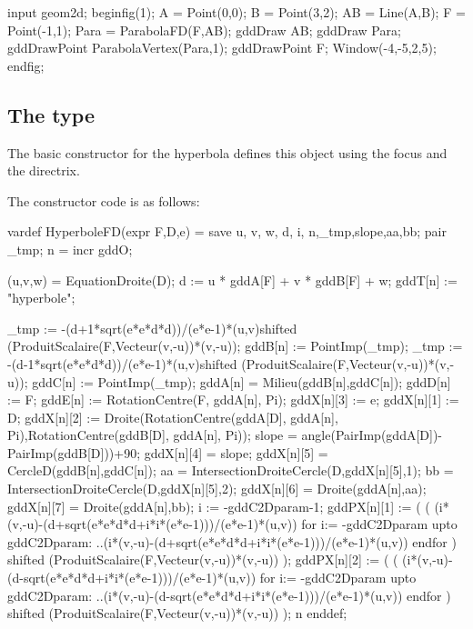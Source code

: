 \documentclass[a4paper,english]{article}
\begin{document}
\begin{ExempleMP}
input geom2d;
beginfig(1);
A = Point(0,0);
B = Point(3,2);
AB = Line(A,B);
F = Point(-1,1);
Para = ParabolaFD(F,AB);
gddDraw AB;
gddDraw Para;
gddDrawPoint ParabolaVertex(Para,1);
gddDrawPoint F;
Window(-4,-5,2,5);
endfig;
\end{ExempleMP}


\subsection{The  type}

The basic constructor for the hyperbola defines this object using the focus and
the directrix. 

The constructor code is as follows:
\begin{mpcode}
vardef HyperboleFD(expr F,D,e) =
  save u, v, w, d, i, n,_tmp,slope,aa,bb; 
  pair _tmp;
  n = incr gddO;

  (u,v,w) = EquationDroite(D);
  d := u * gddA[F] + v * gddB[F] + w;
  gddT[n] := "hyperbole"; 
  
  _tmp := -(d+1*sqrt(e*e*d*d))/(e*e-1)*(u,v)shifted (ProduitScalaire(F,Vecteur(v,-u))*(v,-u));
  gddB[n] := PointImp(_tmp);
  _tmp := -(d-1*sqrt(e*e*d*d))/(e*e-1)*(u,v)shifted
  (ProduitScalaire(F,Vecteur(v,-u))*(v,-u));
  gddC[n] := PointImp(_tmp);
  gddA[n] = Milieu(gddB[n],gddC[n]);
  gddD[n] := F;
  gddE[n] := RotationCentre(F, gddA[n], Pi);
  gddX[n][3] := e; %
  gddX[n][1] := D; %
  gddX[n][2] := Droite(RotationCentre(gddA[D], gddA[n], Pi),RotationCentre(gddB[D], gddA[n], Pi));
  slope = angle(PairImp(gddA[D])-PairImp(gddB[D]))+90;
  gddX[n][4] = slope;
  gddX[n][5] = CercleD(gddB[n],gddC[n]);
  aa = IntersectionDroiteCercle(D,gddX[n][5],1);
  bb = IntersectionDroiteCercle(D,gddX[n][5],2);
  gddX[n][6] = Droite(gddA[n],aa);
  gddX[n][7] = Droite(gddA[n],bb);
  i := -gddC2Dparam-1;
  gddPX[n][1] := (
    (
    (i*(v,-u)-(d+sqrt(e*e*d*d+i*i*(e*e-1)))/(e*e-1)*(u,v))
    for i:= -gddC2Dparam upto gddC2Dparam:
      ..(i*(v,-u)-(d+sqrt(e*e*d*d+i*i*(e*e-1)))/(e*e-1)*(u,v))
    endfor
  ) shifted (ProduitScalaire(F,Vecteur(v,-u))*(v,-u))
  );
  gddPX[n][2] := (
    (
    (i*(v,-u)-(d-sqrt(e*e*d*d+i*i*(e*e-1)))/(e*e-1)*(u,v))
    for i:= -gddC2Dparam upto gddC2Dparam:
      ..(i*(v,-u)-(d-sqrt(e*e*d*d+i*i*(e*e-1)))/(e*e-1)*(u,v))
    endfor
  ) shifted (ProduitScalaire(F,Vecteur(v,-u))*(v,-u))
  );
  n
enddef;
\end{mpcode}
\end{document}
